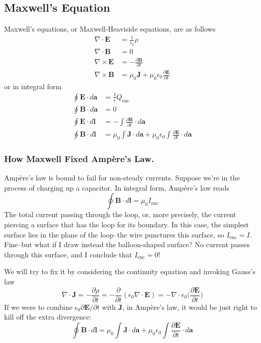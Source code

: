\documentclass[../../../main.tex]{subfiles}
\begin{document}
\subsection*{Maxwell's Equation}
Maxwell's equations, or Maxwell-Heaviside equations, are as follows
\begin{align*}
    \nabla\cdot\mathbf{E}&=\frac{1}{\epsilon_0}\rho\\
    \nabla\cdot\mathbf{B}&=0\\
    \nabla\times\mathbf{E}&=-\frac{\partial \mathbf{B}}{\partial t}\\
    \nabla\times\mathbf{B}&=\mu_0\mathbf{J}+\mu_0\epsilon_0\frac{\partial \mathbf{E}}{\partial t}
\end{align*}
or in integral form 
\begin{align*}
    \oint \mathbf{E}\cdot d\mathbf{a}&=\frac{1}{\epsilon}Q_\text{enc}\\
    \oint \mathbf{B}\cdot d\mathbf{a}&=0\\
    \oint \mathbf{E}\cdot d\mathbf{l}&=-\int \frac{\partial \mathbf{B}}{\partial t}\cdot d\mathbf{a}\\
    \oint \mathbf{B}\cdot d\mathbf{l}&=\mu_0\int\mathbf{J}\cdot d\mathbf{a}+ \mu_0\epsilon_0 \int\frac{\partial \mathbf{E}}{\partial t}\cdot d\mathbf{a}
\end{align*}

\subsubsection*{How Maxwell Fixed Ampère’s Law.} Ampère’s law is bound to fail for non-steady currents. Suppose we’re in the process of charging up a capacitor. In integral form, Ampère’s law reads
\begin{equation*}
    \oint \mathbf{B}\cdot d\mathbf{l}=\mu_0 I_\text{enc}
\end{equation*}
The total current passing through the loop, or, more precisely, the current piercing a surface that has the loop for its boundary. In this case, the simplest surface lies in the plane of the loop--the wire punctures this surface, so $I_\text{enc} = I$. Fine--but what if I draw instead the balloon-shaped surface? No current passes through this surface, and I conclude that $I_\text{enc} = 0$!

We will try to fix it by considering the continuity equation and  invoking Gauss's law
\begin{equation*}
    \nabla\cdot\mathbf{J}=-\frac{\partial \rho}{\partial t}=-\frac{\partial }{\partial t}(\epsilon_0 \nabla\cdot \mathbf{E})=-\nabla\cdot\epsilon_0\biggl(\frac{\partial \mathbf{E}}{\partial t}\biggr)
\end{equation*}
If we were to combine $\epsilon_0 \partial \mathbf{E}/\partial t$ with \textbf{J}, in Ampère’s law, it would be just right to kill off the extra divergence:
\begin{equation*}
    \oint \mathbf{B}\cdot d\mathbf{l} =\mu_0\int\mathbf{J}\cdot d\mathbf{a}+ \mu_0\epsilon_0 \int\frac{\partial \mathbf{E}}{\partial t}\cdot d\mathbf{a}
\end{equation*}
\end{document}
